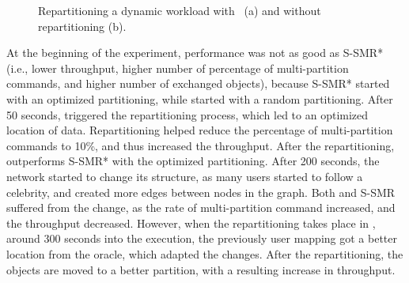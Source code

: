 \begin{figure}[h!]
\begin{subfigure}{.42\textwidth}
    \caption{}
  \end{subfigure}
  \caption{Repartitioning a dynamic workload with \dynastar~(a) and \ssmr* without repartitioning (b).}%
  \label{fig:socialcelebrity}
\end{figure}

At the beginning of the experiment, \dynastar performance was not as good as S-SMR* (i.e., lower throughput, higher number of
percentage of multi-partition commands, and higher number of exchanged objects), because S-SMR* started with an optimized
partitioning, while \dynastar started with a random partitioning. 
After 50 seconds, \dynastar triggered the repartitioning process, which led to an optimized location of data. Repartitioning helped
reduce the percentage of multi-partition commands to 10\%, and thus increased the throughput. After the repartitioning, \dynastar outperforms S-SMR* with the optimized partitioning.
After 200 seconds, the network started to change its structure, as many users started to follow a celebrity, and created more edges
between nodes in the graph. Both \dynastar and S-SMR suffered from the change, as the rate of multi-partition command increased, and the throughput
decreased. However, when the repartitioning takes place in \dynastar, around 300 seconds into the execution, the previously user mapping
got a better location from the oracle, which adapted the changes. After the repartitioning, the objects are moved to a better partition, with a resulting increase in throughput.


